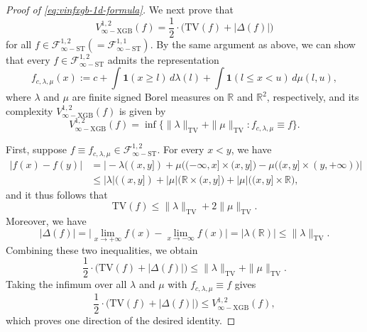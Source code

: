 \documentclass[10pt]{article}
\newcommand{\R}{{\mathbb R}}
\newcommand{\tv}{{\text{TV}}}
\newcommand{\ind}{{\mathbf{1}}}
\begin{document}
\begin{proof}[Proof of \eqref{eq:vinfxgb-1d-formula}]
We next prove that 
\begin{equation*}
    V^{1, 2}_{\infty-\text{XGB}}(f) 
    = \frac{1}{2} \cdot \big(\tv(f) + |\Delta(f)|\big)
\end{equation*}
for all $f \in \mathcal{F}^{1, 2}_{\infty-\text{ST}} 
(= \mathcal{F}^{1, 1}_{\infty-\text{ST}})$.
By the same argument as above, we can show that every 
$f \in \mathcal{F}^{1, 2}_{\infty-\text{ST}}$ admits the representation 
\begin{equation*}
    f_{c, \lambda, \mu} (x) :=  c + \int \ind(x \ge l) \, d\lambda(l) 
    + \int \ind(l \le x < u) \, d\mu(l, u),
\end{equation*}
where $\lambda$ and $\mu$ are finite signed Borel measures on $\R$ and 
$\R^2$, respectively, and its complexity $V^{1, 2}_{\infty-\text{XGB}}(f)$ 
is given by 
\begin{equation*}
    V^{1, 2}_{\infty-\text{XGB}}(f) 
    = \inf\big\{\|\lambda\|_{\text{TV}} + \|\mu\|_{\text{TV}}: 
    f_{c, \lambda, \mu} \equiv f \big\}.
\end{equation*}

First, suppose 
$f \equiv f_{c, \lambda, \mu} \in \mathcal{F}^{1, 2}_{\infty-\text{ST}}$.
For every $x < y$, we have
\begin{equation*}
\begin{aligned}
    |f(x) - f(y)| 
    &= \big|-\lambda((x, y]) + \mu\big((-\infty, x] \times (x, y]\big) 
    - \mu\big((x, y] \times (y, +\infty)\big)\big| \\
    &\le |\lambda|((x, y]) + |\mu|\big(\R \times (x, y]\big) 
    + |\mu|\big((x, y] \times \R\big),
\end{aligned}
\end{equation*}
and it thus follows that 
\begin{equation*}
    \tv(f) \le \|\lambda\|_{\text{TV}} + 2\|\mu\|_{\text{TV}}.    
\end{equation*}
Moreover, we have
\begin{equation*}
    |\Delta(f)| 
    = \big|\lim_{x \to +\infty} f(x) - \lim_{x \to -\infty} f(x)\big|
    = |\lambda(\R)| \le \|\lambda\|_{\text{TV}}.
\end{equation*}
Combining these two inequalities, we obtain
\begin{equation*}
    \frac{1}{2} \cdot \big(\tv(f) + |\Delta(f)|\big) 
    \le \|\lambda\|_{\text{TV}} + \|\mu\|_{\text{TV}}.
\end{equation*}
Taking the infimum over all $\lambda$ and $\mu$ with
$f_{c, \lambda, \mu} \equiv f$ gives
\begin{equation*}
    \frac{1}{2} \cdot \big(\tv(f) + |\Delta(f)|\big)
    \le V^{1, 2}_{\infty-\text{XGB}}(f),
\end{equation*}
which proves one direction of the desired identity.


\end{proof}
\end{document}
